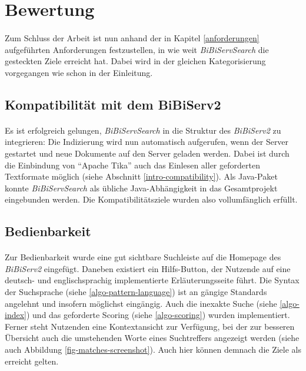\newpage

\section{Bewertung}
\label{fazit-evaluation}

\paragraph{} Zum Schluss der Arbeit ist nun anhand der in Kapitel \ref{anforderungen} aufgeführten Anforderungen festzustellen, in wie weit \textit{BiBiServSearch} die gesteckten Ziele erreicht hat. Dabei wird in der gleichen Kategorisierung vorgegangen wie schon in der Einleitung.

\subsection{Kompatibilität mit dem BiBiServ2}

\paragraph{} Es ist erfolgreich gelungen, \textit{BiBiServSearch} in die Struktur des \textit{BiBiServ2} zu integrieren: Die Indizierung wird nun automatisch aufgerufen, wenn der Server gestartet und neue Dokumente auf den Server geladen werden. Dabei ist durch die Einbindung von "`Apache Tika"' auch das Einlesen aller geforderten Textformate möglich (siehe Abschnitt \ref{intro-compatibility}). Als Java\texttrademark-Paket konnte \textit{BiBiServSearch} als übliche Java\texttrademark-Abhängigkeit in das Gesamtprojekt eingebunden werden. Die Kompatibilitätsziele wurden also vollumfänglich erfüllt.

\subsection{Bedienbarkeit}

\paragraph{} Zur Bedienbarkeit wurde eine gut sichtbare Suchleiste auf die Homepage des \textit{BiBiServ2} eingefügt. Daneben existiert ein Hilfs-Button, der Nutzende auf eine deutsch- und englischsprachig implementierte Erläuterungsseite führt. Die Syntax der Suchsprache (siehe \ref{algo-pattern-language}) ist an gängige Standards angelehnt und insofern möglichst eingängig. Auch die inexakte Suche (siehe \ref{algo-index}) und das geforderte Scoring (siehe \ref{algo-scoring}) wurden implementiert. Ferner steht Nutzenden eine Kontextansicht zur Verfügung, bei der zur besseren Übersicht auch die umstehenden Worte eines Suchtreffers angezeigt werden (siehe auch Abbildung \ref{fig-matches-screenshot}). Auch hier können demnach die Ziele als erreicht gelten.

